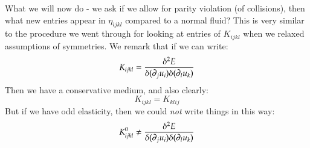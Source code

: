 What we will now do - we ask if we allow for parity violation (of collisions), then what new entries appear in $\eta_{ijkl}$ compared to a normal fluid? This is very similar to the procedure we went through for looking at entries of $K_{ijkl}$ when we relaxed assumptions of symmetries. We remark that if we can write:
\begin{equation}
    K_{ijkl} = \frac{\delta^2 E}{\delta(\partial_j u_i)\delta(\partial_l u_k)}
\end{equation}
Then we have a conservative medium, and also clearly:
\begin{equation}
    K_{ijkl} = K_{klij}
\end{equation}
But if we have odd elasticity, then we could \emph{not} write things in this way:
\begin{equation}
    K^0_{ijkl} \neq \frac{\delta^2 E}{\delta(\partial_j u_i)\delta(\partial_l u_k)}
\end{equation}

